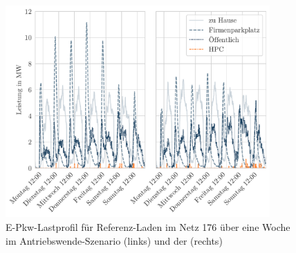 \begin{figure}[H]
    \centering
    \includegraphics[width=0.9\textwidth]{Bilder/example_load_profile}
    \caption{E-Pkw-Lastprofil für Referenz-Laden im Netz \num{176} über eine Woche im Antriebswende-Szenario (links) und der \SzeFirmenparkplatz (rechts)}\label{fig:example_load_profile}
\end{figure}